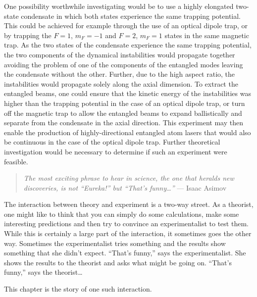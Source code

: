 One possibility worthwhile investigating would be to use a highly elongated two-state condensate in which both states experience the same trapping potential.  This could be achieved for example through the use of an optical dipole trap, or by trapping the $F=1$, $m_F=-1$ and $F=2$, $m_F=1$  states in the same magnetic trap.  As the two states of the condensate experience the same trapping potential, the two components of the dynamical instabilities would propagate together avoiding the problem of one of the components of the entangled modes leaving the condensate without the other.  Further, due to the high aspect ratio, the instabilities would propagate solely along the axial dimension.  To extract the entangled beams, one could ensure that the kinetic energy of the instabilities was higher than the trapping potential in the case of an optical dipole trap, or turn off the magnetic trap to allow the entangled beams to expand ballistically and separate from the condensate in the axial direction.  This experiment may then enable the production of highly-directional entangled atom lasers that would also be continuous in the case of the optical dipole trap.  Further theoretical investigation would be necessary to determine if such an experiment were feasible.

\parasep

\begin{quote}
    \emph{The most exciting phrase to hear in science, the one that heralds new discoveries, is not ``Eureka!'' but ``That's funny\dots''} --- Isaac Asimov
\end{quote}

The interaction between theory and experiment is a two-way street.  As a theorist, one might like to think that you can simply do some calculations, make some interesting predictions and then try to convince an experimentalist to test them.  While this is certainly a large part of the interaction, it sometimes goes the other way.  Sometimes the experimentalist tries something and the results show something that she didn't expect. ``That's funny,'' says the experimentalist.  She shows the results to the theorist and asks what might be going on.  ``That's funny,'' says the theorist\dots

This chapter is the story of one such interaction.



